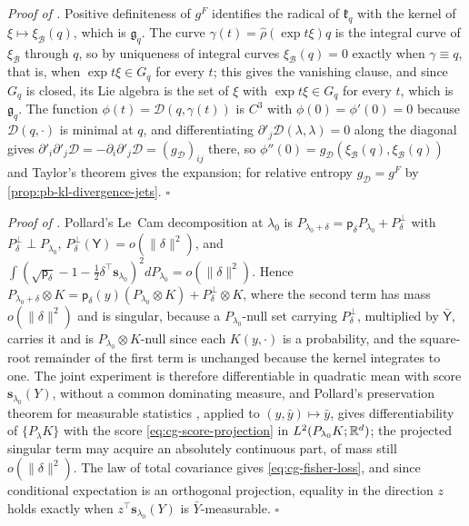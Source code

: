 \noindent\emph{Proof of .}
Positive definiteness of $g^F$ identifies the radical of $\mathfrak k_q$ with the kernel
of $\xi\mapsto\xi_{\mathcal B}(q)$, which is $\mathfrak g_q$.  The curve
$\gamma(t)=\widehat\rho(\exp t\xi)q$ is the integral curve of $\xi_{\mathcal B}$ through
$q$, so by uniqueness of integral curves $\xi_{\mathcal B}(q)=0$ exactly when
$\gamma\equiv q$, that is, when $\exp t\xi\in G_q$ for every $t$; this gives the
vanishing clause, and since $G_q$ is closed, its Lie algebra is the set of $\xi$ with
$\exp t\xi\in G_q$ for every $t$, which is $\mathfrak g_q$.  The
function $\phi(t)=\mathscr D(q,\gamma(t))$ is $C^3$ with $\phi(0)=\phi'(0)=0$ because
$\mathscr D(q,\cdot)$ is minimal at $q$, and differentiating
$\partial'_j\mathscr D(\lambda,\lambda)=0$ along the diagonal gives
$\partial'_i\partial'_j\mathscr D=-\partial_i\partial'_j\mathscr D=(g_{\mathscr D})_{ij}$
there, so $\phi''(0)=g_{\mathscr D}(\xi_{\mathcal B}(q),\xi_{\mathcal B}(q))$ and
Taylor's theorem gives the expansion; for relative entropy $g_{\mathscr D}=g^F$ by
\cref{prop:pb-kl-divergence-jets}.  $\square$

\noindent\emph{Proof of .}
Pollard's Le~Cam decomposition at $\lambda_0$ is
$P_{\lambda_0+\delta}=\mathsf p_\delta P_{\lambda_0}+P_\delta^\perp$ with
$P_\delta^\perp\perp P_{\lambda_0}$, $P_\delta^\perp(\mathsf Y)=o(\lVert\delta\rVert^2)$,
and $\int(\sqrt{\mathsf p_\delta}-1-\tfrac12\delta^\top\mathbf s_{\lambda_0})^2
dP_{\lambda_0}=o(\lVert\delta\rVert^2)$.  Hence
$P_{\lambda_0+\delta}\otimes K=\mathsf p_\delta(y)(P_{\lambda_0}\otimes
K)+P_\delta^\perp\otimes K$, where the second term has mass $o(\lVert\delta\rVert^2)$ and
is singular, because a $P_{\lambda_0}$-null set carrying $P_\delta^\perp$, multiplied by
$\bar{\mathsf Y}$, carries it and is $P_{\lambda_0}\otimes K$-null since each
$K(y,\cdot)$ is a probability, and the square-root remainder of the first term is
unchanged because the kernel integrates to one.  The joint experiment is therefore
differentiable in quadratic mean with score $\mathbf s_{\lambda_0}(Y)$, without a common
dominating measure, and Pollard's preservation theorem for measurable statistics
\citep[Theorem~7]{Pollard2013}, applied to $(y,\bar y)\mapsto\bar y$, gives
differentiability of $\{P_\lambda K\}$ with the score \eqref{eq:cg-score-projection} in
$L^2(P_{\lambda_0}K;\mathbb R^d)$; the projected singular term may acquire an absolutely
continuous part, of mass still $o(\lVert\delta\rVert^2)$.  The law of total covariance
gives \eqref{eq:cg-fisher-loss}, and since conditional expectation is an orthogonal
projection, equality in the direction $z$ holds exactly when
$z^\top\mathbf s_{\lambda_0}(Y)$ is $\bar Y$-measurable.  $\square$

